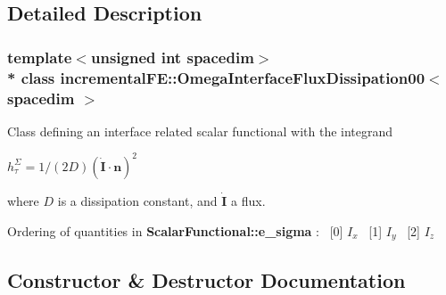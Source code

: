 \subsection{Detailed Description}
\subsubsection*{template$<$unsigned int spacedim$>$\\*
class incremental\+F\+E\+::\+Omega\+Interface\+Flux\+Dissipation00$<$ spacedim $>$}

Class defining an interface related scalar functional with the integrand

$ h^\Sigma_\tau = 1/(2D) \left(\dot{\boldsymbol{I}} \cdot \boldsymbol{n}\right)^2 $

where $D$ is a dissipation constant, and $\dot{\boldsymbol{I}}$ a flux.

Ordering of quantities in {\bf Scalar\+Functional\+::e\+\_\+sigma} \+:~\newline
\mbox{[}0\mbox{]} $I_x$~\newline
 \mbox{[}1\mbox{]} $I_y$~\newline
 \mbox{[}2\mbox{]} $I_z$~\newline
 

\subsection{Constructor \& Destructor Documentation}
